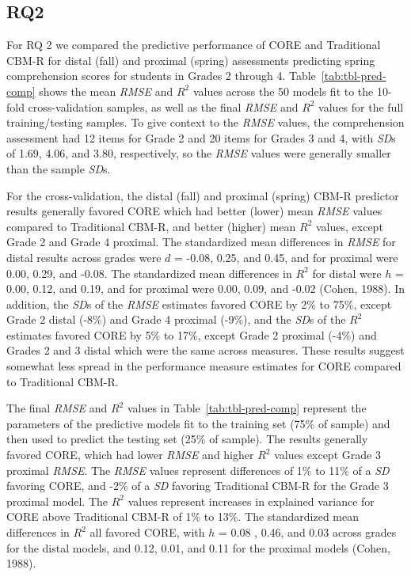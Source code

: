 \documentclass[
  english,
  man, fleqn, noextraspace]{apa6}
\begin{document}
\hypertarget{rq2}{%
\subsection{RQ2}\label{rq2}}

For RQ 2 we compared the predictive performance of CORE and Traditional CBM-R for distal (fall) and proximal (spring) assessments predicting spring comprehension scores for students in Grades 2 through 4. Table~\ref{tab:tbl-pred-comp} shows the mean \emph{RMSE} and \(R^2\) values across the 50 models fit to the 10-fold cross-validation samples, as well as the final \emph{RMSE} and \(R^2\) values for the full training/testing samples. To give context to the \emph{RMSE} values, the comprehension assessment had 12 items for Grade 2 and 20 items for Grades 3 and 4, with \emph{SD}s of 1.69, 4.06, and 3.80, respectively, so the \emph{RMSE} values were generally smaller than the sample \emph{SD}s.

For the cross-validation, the distal (fall) and proximal (spring) CBM-R predictor results generally favored CORE which had better (lower) mean \emph{RMSE} values compared to Traditional CBM-R, and better (higher) mean \(R^2\) values, except Grade 2 and Grade 4 proximal. The standardized mean differences in \emph{RMSE} for distal results across grades were \(d\) = -0.08, 0.25, and 0.45, and for proximal were 0.00, 0.29, and -0.08. The standardized mean differences in \(R^2\) for distal were \(h\) = 0.00, 0.12, and 0.19, and for proximal were 0.00, 0.09, and -0.02 (Cohen, 1988). In addition, the \emph{SD}s of the \emph{RMSE} estimates favored CORE by 2\% to 75\%, except Grade 2 distal (-8\%) and Grade 4 proximal (-9\%), and the \emph{SD}s of the \(R^2\) estimates favored CORE by 5\% to 17\%, except Grade 2 proximal (-4\%) and Grades 2 and 3 distal which were the same across measures. These results suggest somewhat less spread in the performance measure estimates for CORE compared to Traditional CBM-R.

The final \emph{RMSE} and \(R^2\) values in Table~\ref{tab:tbl-pred-comp} represent the parameters of the predictive models fit to the training set (75\% of sample) and then used to predict the testing set (25\% of sample). The results generally favored CORE, which had lower \emph{RMSE} and higher \(R^2\) values except Grade 3 proximal \emph{RMSE}. The \emph{RMSE} values represent differences of 1\% to 11\% of a \emph{SD} favoring CORE, and -2\% of a \emph{SD} favoring Traditional CBM-R for the Grade 3 proximal model. The \(R^2\) values represent increases in explained variance for CORE above Traditional CBM-R of 1\% to 13\%. The standardized mean differences in \(R^2\) all favored CORE, with \(h\) = 0.08 , 0.46, and 0.03 across grades for the distal models, and 0.12, 0.01, and 0.11 for the proximal models (Cohen, 1988).
\end{document}
